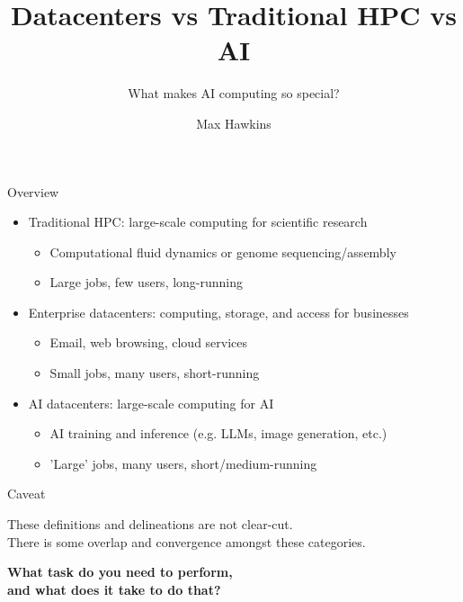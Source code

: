 \documentclass[aspectratio=169]{beamer}
\title{Datacenters vs Traditional HPC vs AI}
\subtitle{What makes AI computing so special?}
\author{Max Hawkins}
\date{}
\institute{Georgia Institute of Technology} %
\begin{document}
\maketitle

\begin{frame}{Overview}
    \begin{itemize}
        \item Traditional HPC: large-scale computing for scientific research
        \begin{itemize}
            \item Computational fluid dynamics or genome sequencing/assembly
            \item Large jobs, few users, long-running
        \end{itemize}
        \item Enterprise datacenters: computing, storage, and access for businesses
         \begin{itemize}
            \item Email, web browsing, cloud services
            \item Small jobs, many users, short-running
        \end{itemize}
        \item AI datacenters: large-scale computing for AI
        \begin{itemize}
            \item AI training and inference (e.g. LLMs, image generation, etc.)
            \item 'Large' jobs, many users, short/medium-running
        \end{itemize}
    \end{itemize}

\end{frame}

\begin{frame}{Caveat}
    \begin{center}
        These definitions and delineations are not clear-cut.\\[1ex]
        There is some overlap and convergence amongst these categories.
    \end{center}
\end{frame}

\begin{frame}{}
    \begin{center}
       \textbf{What task do you need to perform, \\and what does it take to do that?}
    \end{center}
\end{frame}
\end{document}
